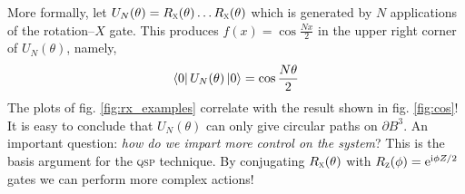 \documentclass{article}
\begin{document}
More formally, let $U_N(\theta) = R_{\textsc{x}}(\theta)\ldots R_{\textsc{x}}(\theta)$ which is generated by $N$ applications of the rotation--$X$ gate. This produces $f(x)=\cos \frac{Nx}{2}$ in the upper right corner of $U_N(\theta)$, namely,
\begin{equation}
    \bra{0}U_N(\theta)\ket{0} = \cos\frac{N\theta}{2}
\end{equation}
The plots of fig. \ref{fig:rx_examples} correlate with the result shown in fig. \ref{fig:cos}! It is easy to conclude that $U_N(\theta)$ can only give circular paths on $\partial B^3$. An important question: \emph{how do we impart more control on the system}? This is the basis argument for the \textsc{qsp} technique. By conjugating $R_{\textsc{x}}(\theta)$ with $R_{\textsc{z}}(\phi) = \mathrm{e}^{\mathrm{i} \phi Z/2}$ gates we can perform more complex actions!
\end{document}
